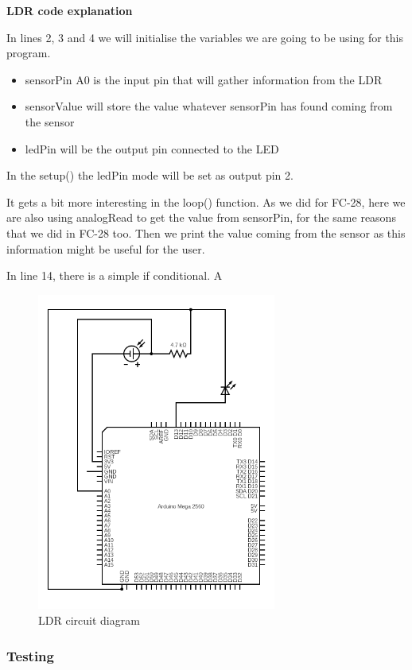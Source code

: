 \textbf{LDR code explanation}

In lines 2, 3 and 4 we will initialise the variables we are going to be using for this program.
\begin{itemize}
	\item sensorPin A0 is the input pin that will gather information from the LDR
	\item sensorValue will store the value whatever sensorPin has found coming from the sensor
	\item ledPin will be the output pin connected to the LED
\end{itemize}

In the setup() the ledPin mode will be set as output pin 2.

It gets a bit more interesting in the loop() function. As we did for FC-28, here we are also using analogRead to get the value from sensorPin, for the same reasons that we did in FC-28 too. Then we print the value coming from the sensor as this information might be useful for the user.

In line 14, there is a simple if conditional. A
\begin{figure}[H]
    \centering
    \includegraphics[width=0.7\textwidth]{fig/ldr-scheme-circuit.png}
    \caption{LDR circuit diagram}
    \label{fig:ldr}
\end{figure}


\subsubsection{Testing}

